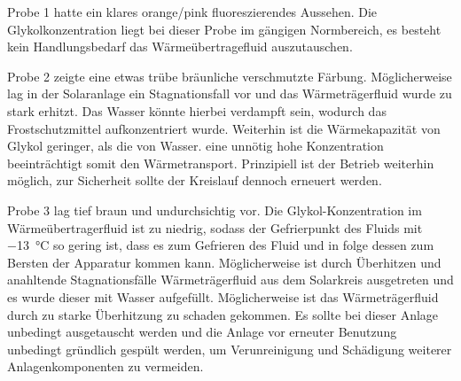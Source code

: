 Probe 1 hatte ein klares orange/pink fluoreszierendes Aussehen. Die Glykolkonzentration liegt bei dieser Probe im gängigen Normbereich, es besteht kein Handlungsbedarf das Wärmeübertragefluid auszutauschen. 

Probe 2 zeigte eine etwas trübe bräunliche verschmutzte Färbung. Möglicherweise lag in der Solaranlage ein Stagnationsfall vor und das Wärmeträgerfluid wurde zu stark erhitzt. Das Wasser könnte hierbei verdampft sein, wodurch das Frostschutzmittel aufkonzentriert wurde. Weiterhin ist die Wärmekapazität von Glykol geringer, als die von Wasser. eine unnötig hohe Konzentration beeinträchtigt somit den Wärmetransport. Prinzipiell ist der Betrieb weiterhin möglich, zur Sicherheit sollte der Kreislauf dennoch erneuert werden.

Probe 3 lag tief braun und undurchsichtig vor.  Die Glykol-Konzentration im Wärmeübertragerfluid ist zu niedrig, sodass der Gefrierpunkt des Fluids mit \SI{-13}{\celsius} so gering ist, dass es zum Gefrieren des Fluid und in folge dessen zum Bersten der Apparatur kommen kann. Möglicherweise ist durch Überhitzen und anahltende Stagnationsfälle Wärmeträgerfluid aus dem Solarkreis ausgetreten und es wurde dieser mit Wasser aufgefüllt. Möglicherweise ist das Wärmeträgerfluid durch zu starke Überhitzung zu schaden gekommen. Es sollte bei dieser Anlage unbedingt ausgetauscht werden und die Anlage vor erneuter Benutzung unbedingt gründlich gespült werden, um Verunreinigung und Schädigung weiterer Anlagenkomponenten zu vermeiden. 